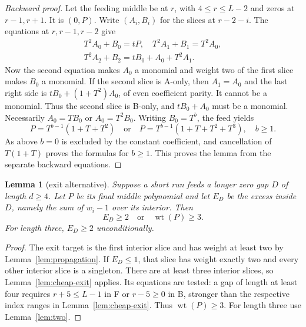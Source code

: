 \documentclass{article}
\newtheorem{lemma}{Lemma}
\DeclareMathOperator{\wt}{wt}
\begin{document}
\begin{proof}[Backward proof]
  Let the feeding middle be at \(r\), with \(4 \le r \le L-2\) and zeros at \(r - 1, r + 1\). It is
  \((0, P)\). Write \((A_i, B_i)\) for the slices at \(r - 2 - i\). The equations at
  \(r, r - 1, r - 2\) give
  \begin{equation}\label{eq:cheap-backward}
    \begin{gathered}
      T^2 A_0 + B_0 = tP, \quad T^2 A_1 + B_1 = T^2 A_0, \\
      T^2 A_2 + B_2 = t B_0 + A_0 + T^2 A_1.
    \end{gathered}
  \end{equation}
  Now the second equation makes \(A_0\) a monomial and weight two of the first slice makes \(B_0\)
  a monomial. If the second slice is A-only, then \(A_1 = A_0\) and the last right side is
  \(t B_0 + (1 + T^2)A_0\), of even coefficient parity. It cannot be a monomial. Thus the second
  slice is B-only, and \(t B_0 + A_0\) must be a monomial. Necessarily \(A_0 = T B_0\) or
  \(A_0 = T^2 B_0\). Writing \(B_0 = T^b\), the feed yields
  \begin{equation}
    P = T^{b-1}(1 + T + T^2) \quad \text{or} \quad
    P = T^{b-1}(1 + T + T^2 + T^3), \quad b \ge 1.
  \end{equation}
  As above \(b = 0\) is excluded by the constant coefficient, and cancellation of \(T(1 + T)\)
  proves the formulas for \(b \ge 1\). This proves the lemma from the separate backward
  equations.
\end{proof}

\begin{lemma}[exit alternative]\label{lem:exit-alternative}
  Suppose a short run feeds a longer zero gap \(D\) of length \(d \ge 4\). Let \(P\) be its final
  middle polynomial and let \(E_D\) be the excess inside \(D\), namely the sum of \(w_i - 1\) over
  its interior. Then
  \begin{equation}\label{eq:exit-alternative}
    E_D \ge 2 \quad \text{or} \quad \wt(P) \ge 3.
  \end{equation}
  For length three, \(E_D \ge 2\) unconditionally.
\end{lemma}

\begin{proof}
  The exit target is the first interior slice and has weight at least two by
  Lemma~\ref{lem:propagation}. If \(E_D \le 1\), that slice has weight exactly two and every other
  interior slice is a singleton. There are at least three interior slices, so
  Lemma~\ref{lem:cheap-exit} applies. Its equations are tested: a gap of length at least four
  requires \(r + 5 \le L-1\) in F or \(r - 5 \ge 0\) in B, stronger than the respective index
  ranges in Lemma~\ref{lem:cheap-exit}. Thus \(\wt(P) \ge 3\). For length three use
  Lemma~\ref{lem:two}.
\end{proof}
\end{document}
